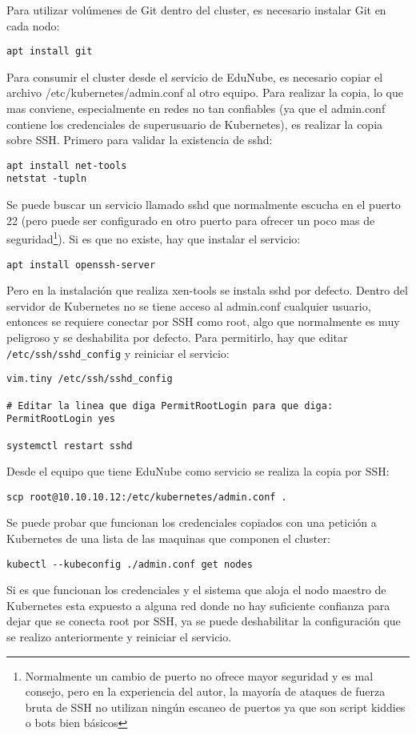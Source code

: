 Para utilizar volúmenes de Git dentro del cluster, es necesario instalar Git en cada nodo:
\begin{lstlisting}
apt install git
\end{lstlisting}

Para consumir el cluster desde el servicio de EduNube, es necesario copiar el archivo /etc/kubernetes/admin.conf al otro equipo. Para realizar la copia, lo que mas conviene, especialmente en redes no tan confiables (ya que el admin.conf contiene los credenciales de superusuario de Kubernetes), es realizar la copia sobre SSH. Primero para validar la existencia de sshd:
\begin{lstlisting}
apt install net-tools
netstat -tupln
\end{lstlisting}
Se puede buscar un servicio llamado sshd que normalmente escucha en el puerto 22 (pero puede ser configurado en otro puerto para ofrecer un poco mas de seguridad\footnote{Normalmente un cambio de puerto no ofrece mayor seguridad y es mal consejo, pero en la experiencia del autor, la mayoría de ataques de fuerza bruta de SSH no utilizan ningún escaneo de puertos ya que son script kiddies o bots bien básicos}). Si es que no existe, hay que instalar el servicio:
\begin{lstlisting}
apt install openssh-server
\end{lstlisting}
Pero en la instalación que realiza xen-tools se instala sshd por defecto. Dentro del servidor de Kubernetes no se tiene acceso al admin.conf cualquier usuario, entonces se requiere conectar por SSH como root, algo que normalmente es muy peligroso y se deshabilita por defecto. Para permitirlo, hay que editar \texttt{/etc/ssh/sshd\_config} y reiniciar el servicio:
\begin{lstlisting}
vim.tiny /etc/ssh/sshd_config

# Editar la linea que diga PermitRootLogin para que diga:
PermitRootLogin yes

systemctl restart sshd
\end{lstlisting}

Desde el equipo que tiene EduNube como servicio se realiza la copia por SSH:
\begin{lstlisting}
scp root@10.10.10.12:/etc/kubernetes/admin.conf .
\end{lstlisting}
Se puede probar que funcionan los credenciales copiados con una petición a Kubernetes de una lista de las maquinas que componen el cluster:
\begin{lstlisting}
kubectl --kubeconfig ./admin.conf get nodes
\end{lstlisting}
Si es que funcionan los credenciales y el sistema que aloja el nodo maestro de Kubernetes esta expuesto a alguna red donde no hay suficiente confianza para dejar que se conecta root por SSH, ya se puede deshabilitar la configuración que se realizo anteriormente y reiniciar el servicio.

